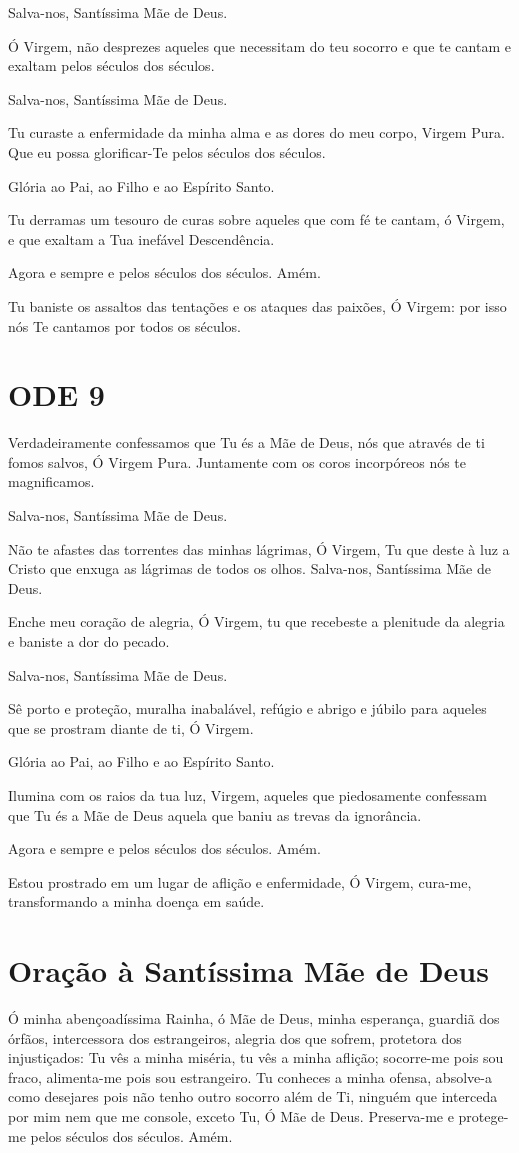 \documentclass{subfiles}
\begin{document}
Salva-nos, Santíssima Mãe de Deus.

Ó Virgem, não desprezes aqueles que necessitam do teu socorro e que
te cantam e exaltam pelos séculos dos séculos.

Salva-nos, Santíssima Mãe de Deus.

Tu curaste a enfermidade da minha alma e as dores do meu corpo,
Virgem Pura. Que eu possa glorificar-Te pelos séculos dos séculos.

Glória ao Pai, ao Filho e ao Espírito Santo.

Tu derramas um tesouro de curas sobre aqueles que com fé te cantam,
ó Virgem, e que exaltam a Tua inefável Descendência.

Agora e sempre e pelos séculos dos séculos. Amém.

Tu baniste os assaltos das tentações e os ataques das paixões, Ó Virgem: por
isso nós Te cantamos por todos os séculos.

\section*{ODE 9}

\eirmos{}Verdadeiramente confessamos que Tu és a Mãe de Deus, nós
que através de ti fomos salvos, Ó Virgem Pura. Juntamente com os coros
incorpóreos nós te magnificamos.

Salva-nos, Santíssima Mãe de Deus.

Não te afastes das torrentes das minhas lágrimas, Ó Virgem, Tu que
deste à luz a Cristo que enxuga as lágrimas de todos os olhos.
Salva-nos, Santíssima Mãe de Deus.

Enche meu coração de alegria, Ó Virgem, tu que recebeste a plenitude
da alegria e baniste a dor do pecado.

Salva-nos, Santíssima Mãe de Deus.

Sê porto e proteção, muralha inabalável, refúgio e abrigo e júbilo para
aqueles que se prostram diante de ti, Ó Virgem.

Glória ao Pai, ao Filho e ao Espírito Santo.

Ilumina com os raios da tua luz, Virgem, aqueles que piedosamente
confessam que Tu és a Mãe de Deus aquela que baniu as trevas da ignorância.

Agora e sempre e pelos séculos dos séculos. Amém.

Estou prostrado em um lugar de aflição e enfermidade, Ó Virgem, cura-me,
transformando a minha doença em saúde.

\section*{Oração à Santíssima Mãe de Deus}

Ó minha abençoadíssima Rainha, ó Mãe de Deus, minha esperança, guardiã dos
órfãos, intercessora dos estrangeiros, alegria dos que sofrem, protetora dos
injustiçados: Tu vês a minha miséria, tu vês a minha aflição; socorre-me pois
sou fraco, alimenta-me pois sou estrangeiro. Tu conheces a minha ofensa,
absolve-a como desejares pois não tenho outro socorro além de Ti, ninguém que
interceda por mim nem que me console, exceto Tu, Ó Mãe de Deus. Preserva-me e
protege-me pelos séculos dos séculos. Amém.
\end{document}
